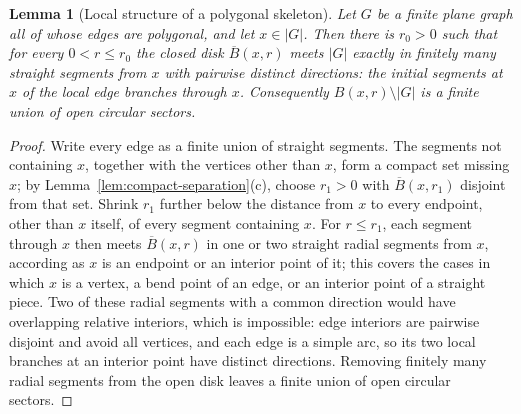 \documentclass[11pt]{article}
\theoremstyle{mainplain}
\newtheorem{lemma}[theorem]{Lemma}
\theoremstyle{mainroman}
\theoremstyle{definition}
\numberwithin{equation}{section}
\begin{document}
\begin{lemma}[Local structure of a polygonal skeleton]\label{lem:local-skeleton-structure}
Let \(G\) be a finite plane graph all of whose edges are polygonal,
and let \(x\in|G|\). Then there is \(r_0>0\) such that for every
\(0<r\le r_0\) the closed disk \(\overline B(x,r)\) meets \(|G|\)
exactly in finitely many straight segments from \(x\) with pairwise
distinct directions: the initial segments at \(x\) of the local edge
branches through \(x\). Consequently
\(B(x,r)\setminus|G|\) is a finite union of open circular
sectors.
\end{lemma}
\begin{proof}
Write every edge as a finite union of straight segments. The segments
not containing \(x\), together with the vertices other than \(x\),
form a compact set missing \(x\); by
Lemma~\ref{lem:compact-separation}\textup{(c)}, choose \(r_1>0\) with
\(\overline B(x,r_1)\) disjoint from that set. Shrink \(r_1\) further
below the distance from \(x\) to every endpoint, other than \(x\)
itself, of every segment containing \(x\). For \(r\le r_1\), each
segment through \(x\) then meets \(\overline B(x,r)\) in one or two
straight radial segments from \(x\), according as \(x\) is an endpoint
or an interior point of it; this covers the cases in which \(x\) is a
vertex, a bend point of an edge, or an interior point of a straight
piece. Two of these radial segments with a common direction would have
overlapping relative interiors, which is impossible: edge interiors
are pairwise disjoint and avoid all vertices, and each edge is a
simple arc, so its two local branches at an interior point have
distinct directions. Removing finitely many radial segments from the
open disk leaves a finite union of open circular sectors.
\end{proof}
\end{document}
